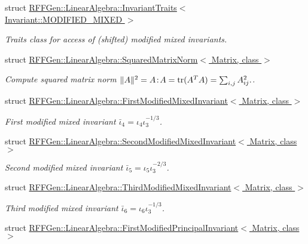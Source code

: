 \begin{DoxyCompactItemize}
struct \hyperlink{structRFFGen_1_1LinearAlgebra_1_1InvariantTraits_3_01Invariant_1_1MODIFIED__MIXED_01_4}{R\-F\-F\-Gen\-::\-Linear\-Algebra\-::\-Invariant\-Traits$<$ Invariant\-::\-M\-O\-D\-I\-F\-I\-E\-D\-\_\-\-M\-I\-X\-E\-D $>$}
\begin{DoxyCompactList}\small\item\em Traits class for access of (shifted) modified mixed invariants. \end{DoxyCompactList}\item 
struct \hyperlink{structRFFGen_1_1LinearAlgebra_1_1SquaredMatrixNorm}{R\-F\-F\-Gen\-::\-Linear\-Algebra\-::\-Squared\-Matrix\-Norm$<$ Matrix, class $>$}
\begin{DoxyCompactList}\small\item\em Compute squared matrix norm $ \|A\|^2 = A\negthinspace : \negthinspace A = \mathrm{tr}(A^TA) = \sum_{i,j} A_{ij}^2. $. \end{DoxyCompactList}\item 
struct \hyperlink{structRFFGen_1_1LinearAlgebra_1_1FirstModifiedMixedInvariant}{R\-F\-F\-Gen\-::\-Linear\-Algebra\-::\-First\-Modified\-Mixed\-Invariant$<$ Matrix, class $>$}
\begin{DoxyCompactList}\small\item\em First modified mixed invariant $\bar\iota_4=\iota_4\iota_3^{-1/3}$. \end{DoxyCompactList}\item 
struct \hyperlink{structRFFGen_1_1LinearAlgebra_1_1SecondModifiedMixedInvariant}{R\-F\-F\-Gen\-::\-Linear\-Algebra\-::\-Second\-Modified\-Mixed\-Invariant$<$ Matrix, class $>$}
\begin{DoxyCompactList}\small\item\em Second modified mixed invariant $\bar\iota_5=\iota_5\iota_3^{-2/3}$. \end{DoxyCompactList}\item 
struct \hyperlink{structRFFGen_1_1LinearAlgebra_1_1ThirdModifiedMixedInvariant}{R\-F\-F\-Gen\-::\-Linear\-Algebra\-::\-Third\-Modified\-Mixed\-Invariant$<$ Matrix, class $>$}
\begin{DoxyCompactList}\small\item\em Third modified mixed invariant $\bar\iota_6=\iota_6\iota_3^{-1/3}$. \end{DoxyCompactList}\item 
struct \hyperlink{structRFFGen_1_1LinearAlgebra_1_1FirstModifiedPrincipalInvariant}{R\-F\-F\-Gen\-::\-Linear\-Algebra\-::\-First\-Modified\-Principal\-Invariant$<$ Matrix, class $>$}

\end{DoxyCompactItemize}
